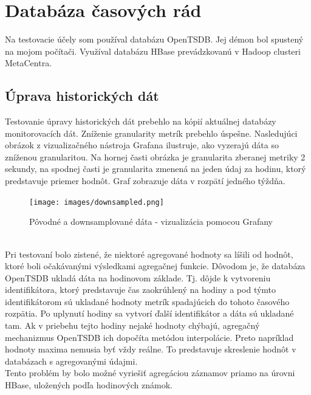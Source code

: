 \documentclass[printed,11pt,twoside,color,cover,table]{fithesis3}
\begin{document}
\section{Databáza časových rád}
\label{sec:database}
Na testovacie účely som používal databázu OpenTSDB. Jej démon bol spustený na mojom počítači. Využíval databázu HBase prevádzkovanú 
v Hadoop clusteri MetaCentra.

\subsection{Úprava historických dát}
Testovanie úpravy historických dát prebehlo na kópií aktuálnej databázy monitorovacích dát. Zníženie granularity metrík prebehlo úspešne.
Nasledujúci obrázok z vizualizačného nástroja Grafana ilustruje, ako vyzerajú dáta so zníženou granularitou. Na hornej časti obrázka je 
granularita zberanej metriky 2 sekundy, na spodnej časti je granularita zmenená na jeden údaj za hodinu, ktorý predstavuje priemer hodnôt.
Graf zobrazuje dáta v rozpätí jedného týždňa.
\begin{figure}[p]
\begin{center} 
       \texttt{[image: images/downsampled.png]}
       \caption{Pôvodné a downsamplované dáta - vizualizácia pomocou Grafany}
\end{center}
\end{figure}
\\Pri testovaní bolo zistené, že niektoré agregované hodnoty sa líšili od hodnôt, ktoré boli očakávanými výsledkami agregačnej funkcie.
Dôvodom je, že databáza OpenTSDB ukladá dáta na hodinovom základe. Tj. dôjde k vytvoreniu identifikátora, ktorý predstavuje čas
zaokrúhlený na hodiny a pod týmto identifikátorom sú ukladané hodnoty metrík spadajúcich do tohoto časového rozpätia. Po
uplynutí hodiny sa vytvorí ďalší identifikátor a dáta sú ukladané tam. Ak v priebehu tejto hodiny nejaké hodnoty chýbajú,
agregačný mechanizmus OpenTSDB ich dopočíta metódou interpolácie. Preto napríklad hodnoty maxima nemusia byť vždy reálne.
To predstavuje skreslenie hodnôt v databázach s agregovanými údajmi. 
\\Tento problém by bolo možné vyriešiť agregáciou záznamov priamo na úrovni HBase, uložených podľa hodinových známok.
\end{document}
